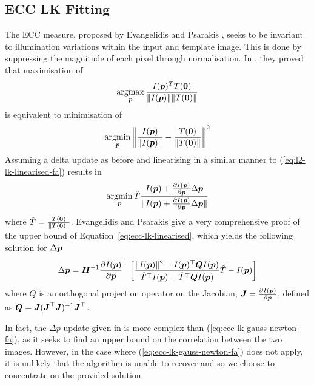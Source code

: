 \subsection{ECC LK Fitting}\label{subsec:lk-ecc}
The ECC measure, proposed by Evangelidis and Psarakis \cite{RefWorks:59}, seeks to be invariant to illumination variations within the input and template image. This is done by suppressing the magnitude of each pixel through normalisation. In \cite{RefWorks:59}, they proved that maximisation of
\begin{equation}\label{eq:ecc-lk-max}
   \argmax_{\p} \frac{I(\p)^T T(\zero)}{\norm{I(\p)} \norm{T(\zero)}}
\end{equation}
is equivalent to minimisation of
\begin{equation}\label{eq:ecc-lk-min}
    \argmin_{\p} \left \lVert \frac{I(\p)}{\norm{I(\p)}} - \frac{T(\zero)}{\norm{T(\zero)}} \right \rVert^2
\end{equation}
Assuming a delta update as before and linearising in a similar manner to (\ref{eq:l2-lk-linearised-fa}) results in
\begin{equation}\label{eq:ecc-lk-linearised}
    \argmin_{\p} \hat{T} \frac{I(\p) + \frac{\partial I(\p)}{\partial \p} \Delta \p}{\norm{{I(\p) + \frac{\partial I(\p)}{\partial \p} \Delta \p}}}
\end{equation}
where $\hat{T} = \frac{T(\boldsymbol{0})}{\lVert T(\boldsymbol{0}) \rVert}$.
Evangelidis and Psarakis \cite{RefWorks:59} give a very comprehensive proof of the upper bound of Equation~\ref{eq:ecc-lk-linearised}, which yields the following solution for $\Delta \boldsymbol{p}$
\begin{equation}\label{eq:ecc-lk-gauss-newton-fa}
    \Delta \p = \boldsymbol{H}^{-1} \frac{\partial I(\p)}{\partial \p}^{\top} \left[ \frac{\norm{I(\p)}^2 - I(\p)^{\top} \boldsymbol{Q} I(\p)}{\hat{T}^{\top} I(\p) - \hat{T}^{\top} \boldsymbol{Q} I(\p)} \hat{T} - I(\p) \right]
\end{equation}
where $Q$ is an orthogonal projection operator on the Jacobian, $\boldsymbol{J} = \frac{\partial I(\boldsymbol{p})}{\partial \boldsymbol{p}}$, defined as $\boldsymbol{Q} = \boldsymbol{J} (\boldsymbol{J}^\top \boldsymbol{J})^{-1} \boldsymbol{J}^\top$.

In fact, the $\Delta p$ update given in \cite{RefWorks:59} is more complex than (\ref{eq:ecc-lk-gauss-newton-fa}), as it seeks to find an upper bound on the correlation between the two images. However, in the case where (\ref{eq:ecc-lk-gauss-newton-fa}) does not apply, it is unlikely that the algorithm is unable to recover and so we choose to concentrate on the provided solution.
